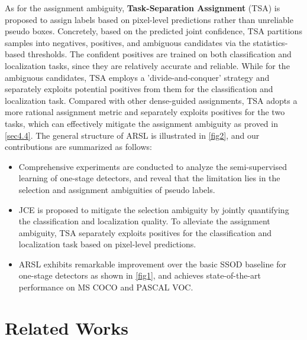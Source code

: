 \documentclass[10pt,twocolumn,letterpaper]{article}
\begin{document}
As for the assignment ambiguity, \textbf{Task-Separation Assignment} (TSA) is proposed to assign labels based on pixel-level predictions rather than unreliable pseudo boxes.
Concretely, based on the predicted joint confidence, TSA partitions samples into negatives, positives, and ambiguous candidates via the statistics-based thresholds.
The confident positives are trained on both classification and localization tasks, since they are relatively accurate and reliable.
While for the ambiguous candidates, TSA employs a ’divide-and-conquer’ strategy and separately exploits potential positives from them for the classification and localization task.
Compared with other dense-guided assignments\cite{DenseTeacher,DenseGuided,HumbleTeacher}, TSA adopts a more rational assignment metric and separately exploits positives for the two tasks, which can effectively mitigate the assignment ambiguity as proved in \cref{sec4.4}.
The general structure of ARSL is illustrated in \cref{fig2}, and our contributions are summarized as follows:
\begin{itemize}
\setlength{\itemsep}{0pt}
\setlength{\parskip}{0pt}
\item Comprehensive experiments are conducted to analyze the semi-supervised learning of one-stage detectors, and reveal that the limitation lies in the selection and assignment ambiguities of pseudo labels.
\item JCE is proposed to mitigate the selection ambiguity by jointly quantifying the classification and localization quality. To alleviate the assignment ambiguity, TSA separately exploits positives for the classification and localization task based on pixel-level predictions.
\item ARSL exhibits remarkable improvement over the basic SSOD baseline for one-stage detectors as shown in \cref{fig1}, and achieves state-of-the-art performance on MS COCO and PASCAL VOC.
\end{itemize}

\section{Related Works}
\label{sec2}
\end{document}
